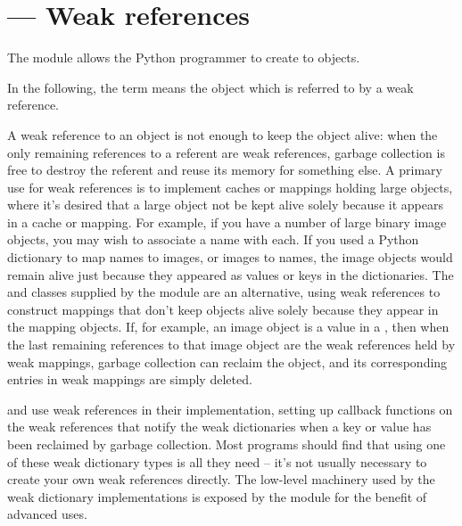 \section{ ---
         Weak references}




The  module allows the Python programmer to create
 to objects.

In the following, the term  means the
object which is referred to by a weak reference.

A weak reference to an object is not enough to keep the object alive:
when the only remaining references to a referent are weak references,
garbage collection is free to destroy the referent and reuse its memory
for something else.  A primary use for weak references is to implement
caches or mappings holding large objects, where it's desired that a
large object not be kept alive solely because it appears in a cache or
mapping.  For example, if you have a number of large binary image objects,
you may wish to associate a name with each.  If you used a Python
dictionary to map names to images, or images to names, the image objects
would remain alive just because they appeared as values or keys in the
dictionaries.  The  and
 classes supplied by the 
module are an alternative, using weak references to construct mappings
that don't keep objects alive solely because they appear in the mapping
objects.  If, for example, an image object is a value in a
, then when the last remaining
references to that image object are the weak references held by weak
mappings, garbage collection can reclaim the object, and its corresponding
entries in weak mappings are simply deleted.

 and  use weak
references in their implementation, setting up callback functions on
the weak references that notify the weak dictionaries when a key or value
has been reclaimed by garbage collection.  Most programs should find that
using one of these weak dictionary types is all they need -- it's
not usually necessary to create your own weak references directly.  The
low-level machinery used by the weak dictionary implementations is exposed
by the  module for the benefit of advanced uses.

